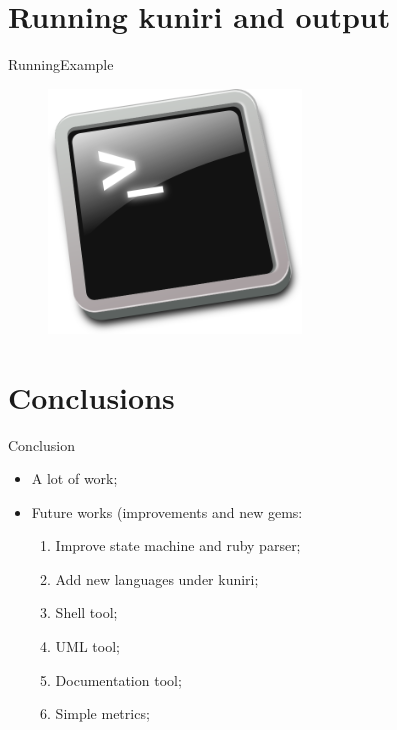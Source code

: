 \documentclass[10pt]{beamer}
\begin{document}
\section{Running kuniri and output}
\begin{frame}{Running}{Example}
  \begin{figure}[overview]
    \includegraphics[width=0.6\textwidth]{images/terminal.png}
  \end{figure}
\end{frame}

\section{Conclusions}
\begin{frame}{Conclusion}{}
  \begin{itemize}
    \item A lot of work;
    \item Future works (improvements and new gems:
      \begin{enumerate}
        \item Improve state machine and ruby parser;
        \item Add new languages under kuniri;
        \item Shell tool;
        \item UML tool;
        \item Documentation tool;
        \item Simple metrics;
      \end{enumerate}
  \end{itemize}
\end{frame}

{\1
\begin{frame}
\end{frame}}
\end{document}
